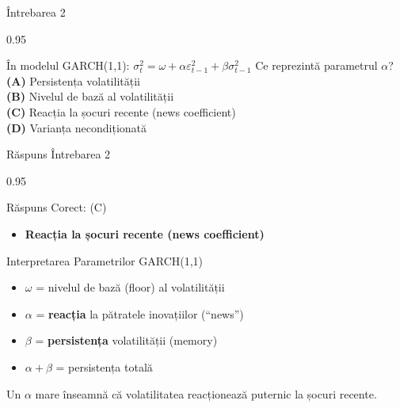 \documentclass[9pt, aspectratio=169, t]{beamer}
\begin{document}
\begin{frame}{Întrebarea 2}
    \begin{cminipage}{0.95\textwidth}
    \begin{block}{În modelul GARCH(1,1): $\sigma_t^2 = \omega + \alpha \varepsilon_{t-1}^2 + \beta \sigma_{t-1}^2$}
        Ce reprezintă parametrul $\alpha$?
        \textcolor{MainBlue}{\textbf{(A)}} Persistența volatilității\\[3pt]
        \textcolor{MainBlue}{\textbf{(B)}} Nivelul de bază al volatilității\\[3pt]
        \textcolor{MainBlue}{\textbf{(C)}} Reacția la șocuri recente (news coefficient)\\[3pt]
        \textcolor{MainBlue}{\textbf{(D)}} Varianța necondiționată
    \end{block}
    \end{cminipage}
\end{frame}

\begin{frame}{Răspuns Întrebarea 2}
    \begin{cminipage}{0.95\textwidth}
    \begin{exampleblock}{Răspuns Corect: (C)}
        \begin{itemize}\setlength{\itemsep}{0pt}
            \item \textbf{Reacția la șocuri recente (news coefficient)}
        \end{itemize}
    \end{exampleblock}

    \pause
    \begin{block}{Interpretarea Parametrilor GARCH(1,1)}
        \begin{itemize}\setlength{\itemsep}{0pt}
            \item $\omega$ = nivelul de bază (floor) al volatilității
            \item $\alpha$ = \textbf{reacția} la pătratele inovațiilor (``news'')
            \item $\beta$ = \textbf{persistența} volatilității (memory)
            \item $\alpha + \beta$ = persistența totală
        \end{itemize}

        \vspace{0.3cm}
        Un $\alpha$ mare înseamnă că volatilitatea reacționează puternic la șocuri recente.
    \end{block}
    \end{cminipage}
\end{frame}
\end{document}
